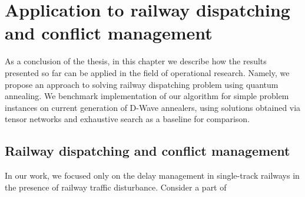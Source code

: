 \chapter{Application to railway dispatching and conflict management}

As a conclusion of the thesis, in this chapter we describe how the results presented so far can be applied in the field of operational research. Namely, we propose an approach to solving railway dispatching problem using quantum annealing. We benchmark implementation of our algorithm for simple problem instances on current generation of D-Wave annealers, using solutions obtained via tensor networks and exhaustive search as a baseline for comparison.


\section{Railway dispatching and conflict management}
In our work, we focused only on the delay management in single-track railways in the presence of railway traffic disturbance. Consider a part of 